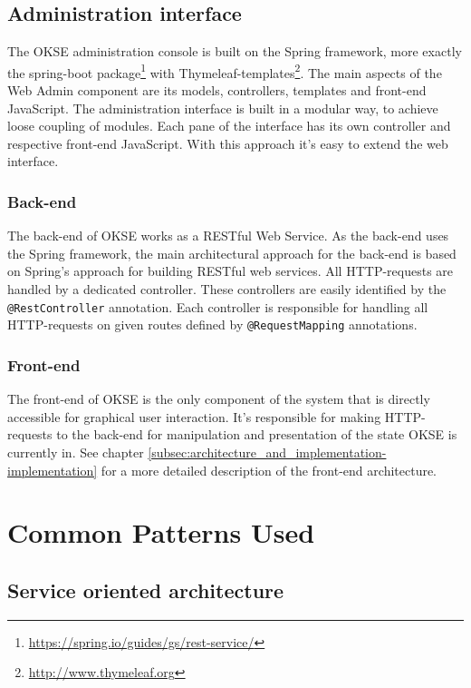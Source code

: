 \subsection{Administration interface}
\label{subsec:administration_interface}

The OKSE administration console is built on the Spring framework, more exactly the spring-boot package\footnote{\url{https://spring.io/guides/gs/rest-service/}} with Thymeleaf-templates\footnote{\url{http://www.thymeleaf.org}}. The main aspects of the Web Admin component are its models, controllers, templates and front-end JavaScript. The administration interface is built in a modular way, to achieve loose coupling of modules. Each pane of the interface has its own controller and respective front-end JavaScript.  With this approach it's easy to extend the web interface.

\subsubsection{Back-end}

The back-end of OKSE works as a RESTful Web Service. As the back-end uses the Spring framework, the main architectural approach for the back-end is based on Spring’s approach for building RESTful web services. All HTTP-requests are handled by a dedicated controller. These controllers are easily identified by the \verb!@RestController! annotation. Each controller is responsible for handling all HTTP-requests on given routes defined by \verb!@RequestMapping! annotations. 

\subsubsection{Front-end}

The front-end of OKSE is the only component of the system that is directly accessible for graphical user interaction. It's responsible for making HTTP-requests to the back-end for manipulation and presentation of the state OKSE is currently in. See chapter \ref{subsec:architecture_and_implementation-implementation} for a more detailed description of the front-end architecture.

\section{Common Patterns Used}
\label{sec:common-patterns-used}

\subsection{Service oriented architecture}

